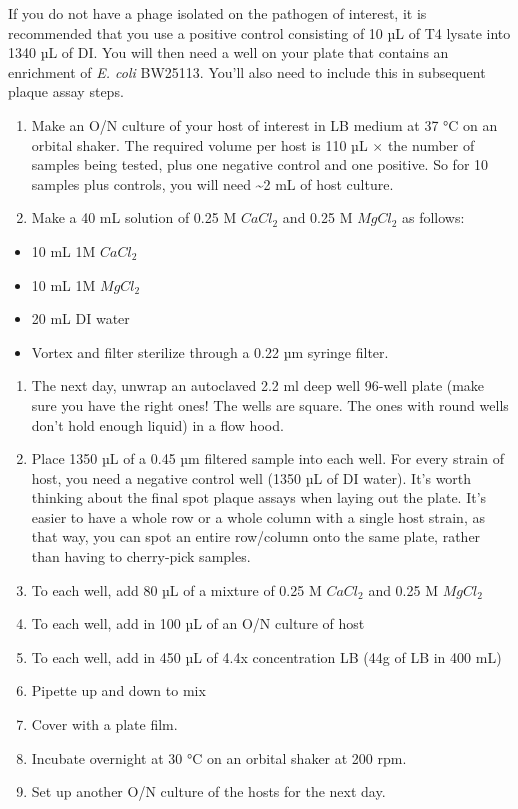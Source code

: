 \documentclass[
]{book}
\providecommand{\tightlist}{%
  \setlength{\itemsep}{0pt}\setlength{\parskip}{0pt}}
\begin{document}
If you do not have a phage isolated on the pathogen of interest, it is recommended that you use a positive control consisting of 10 µL of T4 lysate into 1340 µL of DI. You will then need a well on your plate that contains an enrichment of \emph{E. coli} BW25113. You'll also need to include this in subsequent plaque assay steps.

\begin{enumerate}
\def\labelenumi{\arabic{enumi}.}
\tightlist
\item
  Make an O/N culture of your host of interest in LB medium at 37 °C on an orbital shaker. The required volume per host is 110 µL \(\times\) the number of samples being tested, plus one negative control and one positive. So for 10 samples plus controls, you will need \textasciitilde2 mL of host culture.
\item
  Make a 40 mL solution of 0.25 M \(CaCl_2\) and 0.25 M \(MgCl_2\) as follows:
\end{enumerate}

\begin{itemize}
\tightlist
\item
  10 mL 1M \(CaCl_2\)
\item
  10 mL 1M \(MgCl_2\)
\item
  20 mL DI water
\item
  Vortex and filter sterilize through a 0.22 µm syringe filter.
\end{itemize}

\begin{enumerate}
\def\labelenumi{\arabic{enumi}.}
\setcounter{enumi}{2}
\tightlist
\item
  The next day, unwrap an autoclaved 2.2 ml deep well 96-well plate (make sure you have the right ones! The wells are square. The ones with round wells don't hold enough liquid) in a flow hood.
\item
  Place 1350 µL of a 0.45 µm filtered sample into each well. For every strain of host, you need a negative control well (1350 µL of DI water). It's worth thinking about the final spot plaque assays when laying out the plate. It's easier to have a whole row or a whole column with a single host strain, as that way, you can spot an entire row/column onto the same plate, rather than having to cherry-pick samples.
\item
  To each well, add 80 µL of a mixture of 0.25 M \(CaCl_2\) and 0.25 M \(MgCl_2\)
\item
  To each well, add in 100 µL of an O/N culture of host
\item
  To each well, add in 450 µL of 4.4x concentration LB (44g of LB in 400 mL)
\item
  Pipette up and down to mix
\item
  Cover with a plate film.
\item
  Incubate overnight at 30 °C on an orbital shaker at 200 rpm.
\item
  Set up another O/N culture of the hosts for the next day.
\end{enumerate}

  
\end{document}
